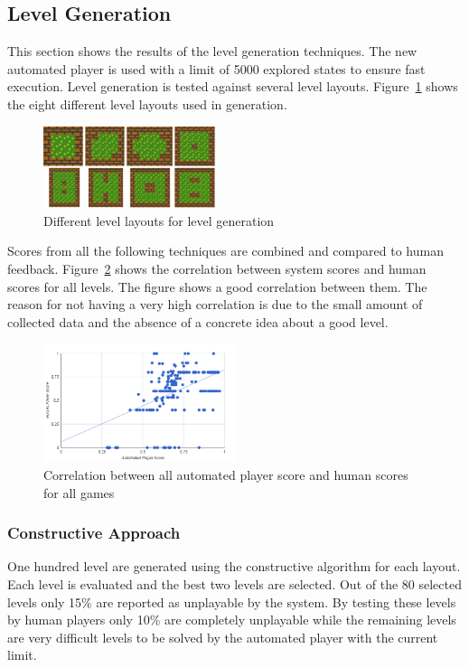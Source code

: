 \documentclass[letterpaper]{article}
\newcommand{\figref}[1]{Figure~\ref{Figure:#1}}
\begin{document}
\subsection{Level Generation}
This section shows the results of the level generation techniques. The new automated player is used with a limit of 5000 explored states to ensure fast execution. Level generation is tested against several level layouts. \figref{levelLayouts} shows the eight different level layouts used in generation.\\\par
\begin{figure}
  	\centering
    \includegraphics[width=0.45\textwidth]{Images/levelLayouts}
    \caption{Different level layouts for level generation}
    \label{Figure:levelLayouts}
\end{figure}

Scores from all the following techniques are combined and compared to human feedback. \figref{totalCorrelation} shows the correlation between system scores and human scores for all levels. The figure shows a good correlation between them. The reason for not having a very high correlation is due to the small amount of collected data and the absence of a concrete idea about a good level.

\begin{figure}
  	\centering
    \includegraphics[width=0.5\textwidth]{Images/totalCorrelation}
    \caption{Correlation between all automated player score and human scores for all games}
    \label{Figure:totalCorrelation}
\end{figure}

\subsubsection{Constructive Approach}
One hundred level are generated using the constructive algorithm for each layout. Each level is evaluated and the best two levels are selected. Out of the 80 selected levels only 15\% are reported as unplayable by the system. By testing these levels by human players only 10\% are completely unplayable while the remaining levels are very difficult levels to be solved by the automated player with the current limit.
\end{document}
